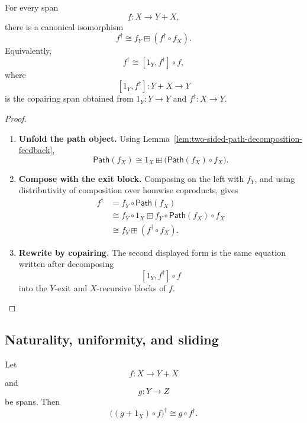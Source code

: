 \begin{theorem}
\label{thm:conway-fixpoint-identity-feedback}
For every span
\[
  f:X\to Y+X,
\]
there is a canonical isomorphism
\[
  f^\dagger
  \cong
  f_Y\boxplus(f^\dagger\circ f_X).
\]
Equivalently,
\[
  f^\dagger
  \cong
  [1_Y,f^\dagger]\circ f,
\]
where
\[
  [1_Y,f^\dagger]:Y+X\to Y
\]
is the copairing span obtained from \(1_Y:Y\to Y\) and
\(f^\dagger:X\to Y\).
\end{theorem}

\begin{proof}
\begin{enumerate}
  \item \textbf{Unfold the path object.}
  Using Lemma~\ref{lem:two-sided-path-decomposition-feedback},
  \[
    \mathsf{Path}(f_X)
    \cong
    1_X\boxplus\bigl(\mathsf{Path}(f_X)\circ f_X\bigr).
  \]

  \item \textbf{Compose with the exit block.}
  Composing on the left with \(f_Y\), and using distributivity of composition
  over homwise coproducts, gives
  \[
  \begin{aligned}
    f^\dagger
    &=
    f_Y\circ\mathsf{Path}(f_X)
    \\
    &\cong
    f_Y\circ1_X
    \boxplus
    f_Y\circ\mathsf{Path}(f_X)\circ f_X
    \\
    &\cong
    f_Y\boxplus(f^\dagger\circ f_X).
  \end{aligned}
  \]

  \item \textbf{Rewrite by copairing.}
  The second displayed form is the same equation written after decomposing
  \[
    [1_Y,f^\dagger]\circ f
  \]
  into the \(Y\)-exit and \(X\)-recursive blocks of \(f\).
\end{enumerate}
\end{proof}

\subsection{Naturality, uniformity, and sliding}
\label{subsec:dagger-naturality-uniformity-feedback}

\begin{theorem}
\label{thm:conway-output-naturality-feedback}
Let
\[
  f:X\to Y+X
\]
and
\[
  g:Y\to Z
\]
be spans. Then
\[
  \bigl((g+1_X)\circ f\bigr)^\dagger
  \cong
  g\circ f^\dagger.
\]
\end{theorem}

